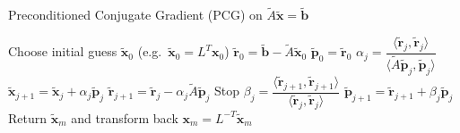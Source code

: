 \begin{algorithm}[ht]
    \caption{Preconditioned Conjugate Gradient (PCG) on $\tilde{A}\tilde{\mathbf{x}}=\tilde{\mathbf{b}}$}
    \label{alg:pcg_tilde}
    \begin{algorithmic}
        \State Choose initial guess $\tilde{\mathbf{x}}_0$ (e.g.\ $\tilde{\mathbf{x}}_0 = L^T \mathbf{x}_0$)
        \State $\tilde{\mathbf{r}}_0 = \tilde{\mathbf{b}} - \tilde{A}\tilde{\mathbf{x}}_0$
        \State $\tilde{\mathbf{p}}_0 = \tilde{\mathbf{r}}_0$
        \State $\alpha_j= \dfrac{\langle \tilde{\mathbf{r}}_j, \tilde{\mathbf{r}}_j\rangle}{\langle \tilde{A}\tilde{\mathbf{p}}_j, \tilde{\mathbf{p}}_j\rangle}$
        \State $\tilde{\mathbf{x}}_{j+1} = \tilde{\mathbf{x}}_j+ \alpha_j\tilde{\mathbf{p}}_j$
        \State $\tilde{\mathbf{r}}_{j+1} = \tilde{\mathbf{r}}_j- \alpha_j\tilde{A}\tilde{\mathbf{p}}_j$
        \State Stop
        \EndIf
        \State $\beta_j= \dfrac{\langle \tilde{\mathbf{r}}_{j+1}, \tilde{\mathbf{r}}_{j+1} \rangle}{\langle \tilde{\mathbf{r}}_j, \tilde{\mathbf{r}}_j\rangle}$
        \State $\tilde{\mathbf{p}}_{j+1} = \tilde{\mathbf{r}}_{j+1} + \beta_j\tilde{\mathbf{p}}_j$
        \EndFor
        \State Return $\tilde{\mathbf{x}}_m$ and transform back $\mathbf{x}_m = L^{-T}\tilde{\mathbf{x}}_m$
    \end{algorithmic}
\end{algorithm}

